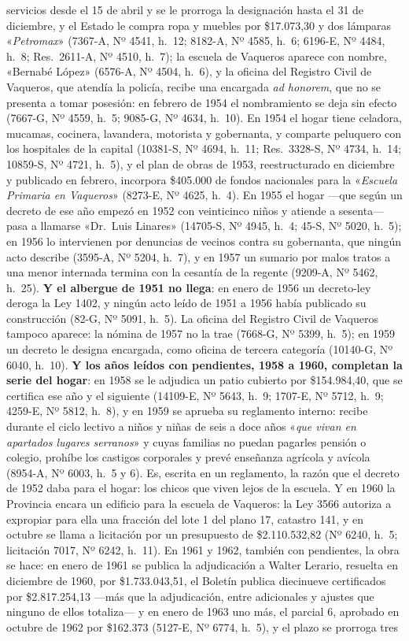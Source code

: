 servicios desde el 15 de abril y se le prorroga la designación hasta el 31 de diciembre, y el Estado le compra ropa y muebles por \$17.073,30 y dos lámparas «\textit{Petromax}» (7367-A, Nº 4541, h.\ 12; 8182-A, Nº 4585, h.\ 6; 6196-E, Nº 4484, h.\ 8; Res.\ 2611-A, Nº 4510, h.\ 7); la escuela de Vaqueros aparece con nombre, «Bernabé López» (6576-A, Nº 4504, h.\ 6), y la oficina del Registro Civil de Vaqueros, que atendía la policía, recibe una encargada \textit{ad honorem}, que no se presenta a tomar posesión: en febrero de 1954 el nombramiento se deja sin efecto (7667-G, Nº 4559, h.\ 5; 9085-G, Nº 4634, h.\ 10). En 1954 el hogar tiene celadora, mucamas, cocinera, lavandera, motorista y gobernanta, y comparte peluquero con los hospitales de la capital (10381-S, Nº 4694, h.\ 11; Res.\ 3328-S, Nº 4734, h.\ 14; 10859-S, Nº 4721, h.\ 5), y el plan de obras de 1953, reestructurado en diciembre y publicado en febrero, incorpora \$405.000 de fondos nacionales para la «\textit{Escuela Primaria en Vaqueros}» (8273-E, Nº 4625, h.\ 4). En 1955 el hogar ---que según un decreto de ese año empezó en 1952 con veinticinco niños y atiende a sesenta--- pasa a llamarse «Dr.\ Luis Linares» (14705-S, Nº 4945, h.\ 4; 45-S, Nº 5020, h.\ 5); en 1956 lo intervienen por denuncias de vecinos contra su gobernanta, que ningún acto describe (3595-A, Nº 5204, h.\ 7), y en 1957 un sumario por malos tratos a una menor internada termina con la cesantía de la regente (9209-A, Nº 5462, h.\ 25). \textbf{Y el albergue de 1951 no llega}: en enero de 1956 un decreto-ley deroga la Ley 1402, y ningún acto leído de 1951 a 1956 había publicado su construcción (82-G, Nº 5091, h.\ 5). La oficina del Registro Civil de Vaqueros tampoco aparece: la nómina de 1957 no la trae (7668-G, Nº 5399, h.\ 5); en 1959 un decreto le designa encargada, como oficina de tercera categoría (10140-G, Nº 6040, h.\ 10). \textbf{Y los años leídos con pendientes, 1958 a 1960, completan la serie del hogar}: en 1958 se le adjudica un patio cubierto por \$154.984,40, que se certifica ese año y el siguiente (14109-E, Nº 5643, h.\ 9; 1707-E, Nº 5712, h.\ 9; 4259-E, Nº 5812, h.\ 8), y en 1959 se aprueba su reglamento interno: recibe durante el ciclo lectivo a niños y niñas de seis a doce años «\textit{que vivan en apartados lugares serranos}» y cuyas familias no puedan pagarles pensión o colegio, prohíbe los castigos corporales y prevé enseñanza agrícola y avícola (8954-A, Nº 6003, h.\ 5 y 6). Es, escrita en un reglamento, la razón que el decreto de 1952 daba para el hogar: los chicos que viven lejos de la escuela. Y en 1960 la Provincia encara un edificio para la escuela de Vaqueros: la Ley 3566 autoriza a expropiar para ella una fracción del lote 1 del plano 17, catastro 141, y en octubre se llama a licitación por un presupuesto de \$2.110.532,82 (Nº 6240, h.\ 5; licitación 7017, Nº 6242, h.\ 11). En 1961 y 1962, también con pendientes, la obra se hace: en enero de 1961 se publica la adjudicación a Walter Lerario, resuelta en diciembre de 1960, por \$1.733.043,51, el Boletín publica diecinueve certificados por \$2.817.254,13 ---más que la adjudicación, entre adicionales y ajustes que ninguno de ellos totaliza--- y en enero de 1963 uno más, el parcial 6, aprobado en octubre de 1962 por \$162.373 (5127-E, Nº 6774, h.\ 5), y el plazo se prorroga tres 
